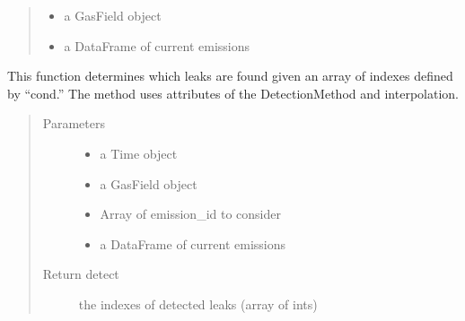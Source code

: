\documentclass[letterpaper,10pt,english]{sphinxmanual}
\begin{document}
\begin{fulllineitems}
\begin{fulllineitems}
\begin{quote}
\begin{description}
\begin{itemize}
\item {} 
 \textendash{} a GasField object

\item {} 
 \textendash{} a DataFrame of current emissions

\end{itemize}

\end{description}\end{quote}

\end{fulllineitems}


\begin{fulllineitems}
\label{\detokenize{index:feast.DetectionModules.comp_survey.CompSurvey.detect_prob_curve}}
This function determines which leaks are found given an array of indexes defined by “cond.”
The method uses attributes of the DetectionMethod and interpolation.
\begin{quote}\begin{description}
\item[{Parameters}] \leavevmode\begin{itemize}
\item {} 
 \textendash{} a Time object

\item {} 
 \textendash{} a GasField object

\item {} 
 \textendash{} Array of emission\_id to consider

\item {} 
 \textendash{} a DataFrame of current emissions

\end{itemize}

\item[{Return detect}] \leavevmode
the indexes of detected leaks (array of ints)


\end{description}
\end{quote}
\end{fulllineitems}
\end{fulllineitems}
\end{document}
